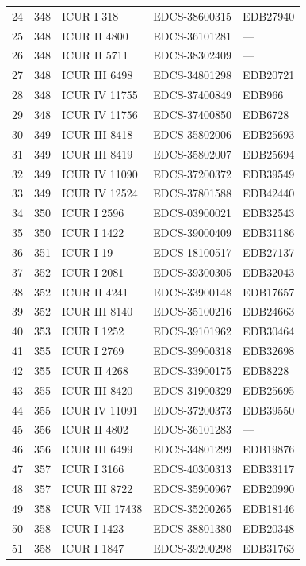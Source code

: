 \begin{longtable}{@{}r r l l l@{}}
24 & 348 & ICUR I 318 & EDCS-38600315 & EDB27940 \\
25 & 348 & ICUR II 4800 & EDCS-36101281 & — \\
26 & 348 & ICUR II 5711 & EDCS-38302409 & — \\
27 & 348 & ICUR III 6498 & EDCS-34801298 & EDB20721 \\
28 & 348 & ICUR IV 11755 & EDCS-37400849 & EDB966 \\
29 & 348 & ICUR IV 11756 & EDCS-37400850 & EDB6728 \\
30 & 349 & ICUR III 8418 & EDCS-35802006 & EDB25693 \\
31 & 349 & ICUR III 8419 & EDCS-35802007 & EDB25694 \\
32 & 349 & ICUR IV 11090 & EDCS-37200372 & EDB39549 \\
33 & 349 & ICUR IV 12524 & EDCS-37801588 & EDB42440 \\
34 & 350 & ICUR I 2596 & EDCS-03900021 & EDB32543 \\
35 & 350 & ICUR I 1422 & EDCS-39000409 & EDB31186 \\
36 & 351 & ICUR I 19 & EDCS-18100517 & EDB27137 \\
37 & 352 & ICUR I 2081 & EDCS-39300305 & EDB32043 \\
38 & 352 & ICUR II 4241 & EDCS-33900148 & EDB17657 \\
39 & 352 & ICUR III 8140 & EDCS-35100216 & EDB24663 \\
40 & 353 & ICUR I 1252 & EDCS-39101962 & EDB30464 \\
41 & 355 & ICUR I 2769 & EDCS-39900318 & EDB32698 \\
42 & 355 & ICUR II 4268 & EDCS-33900175 & EDB8228 \\
43 & 355 & ICUR III 8420 & EDCS-31900329 & EDB25695 \\
44 & 355 & ICUR IV 11091 & EDCS-37200373 & EDB39550 \\
45 & 356 & ICUR II 4802 & EDCS-36101283 & — \\
46 & 356 & ICUR III 6499 & EDCS-34801299 & EDB19876 \\
47 & 357 & ICUR I 3166 & EDCS-40300313 & EDB33117 \\
48 & 357 & ICUR III 8722 & EDCS-35900967 & EDB20990 \\
49 & 358 & ICUR VII 17438 & EDCS-35200265 & EDB18146 \\
50 & 358 & ICUR I 1423 & EDCS-38801380 & EDB20348 \\
51 & 358 & ICUR I 1847 & EDCS-39200298 & EDB31763 \\

\end{longtable}
